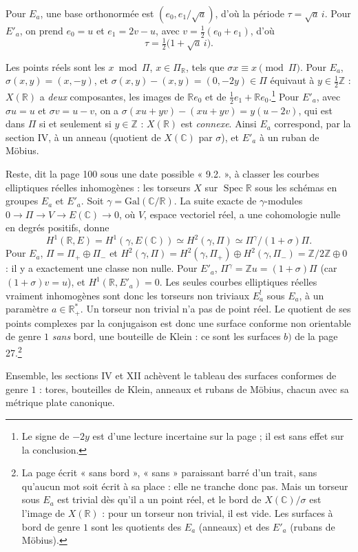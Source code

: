\documentclass[11pt,a4paper]{article}
\begin{document}
Pour $E_a$, une base orthonormée est $(e_0, e_1/\sqrt a)$, d'où la période
$\tau = \sqrt{a}\, i$. Pour $E'_a$, on prend $e_0 = u$ et $e_1 = 2v - u$, avec
$v = \frac12(e_0 + e_1)$, d'où
\[
\tau = \tfrac12\bigl(1 + \sqrt{a}\, i\bigr).
\]

Les points réels sont les $x \bmod \Pi$, $x \in \Pi_{\mathbb{R}}$, tels que
$\sigma x \equiv x \pmod{\Pi}$. Pour $E_a$, $\sigma(x,y) = (x,-y)$, et
$\sigma(x,y) - (x,y) = (0, -2y) \in \Pi$ équivaut à $y \in
\frac12\mathbb{Z}$ : $X(\mathbb{R})$ a \emph{deux} composantes, les images de
$\mathbb{R}e_0$ et de $\frac12 e_1 + \mathbb{R}e_0$.\footnote{Le signe de
$-2y$ est d'une lecture incertaine sur la page ; il est sans effet sur la
conclusion.} Pour $E'_a$, avec $\sigma u = u$ et $\sigma v = u - v$, on a
$\sigma(xu + yv) - (xu + yv) = y(u - 2v)$, qui est dans $\Pi$ si et seulement
si $y \in \mathbb{Z}$ : $X(\mathbb{R})$ est \emph{connexe}. Ainsi $E_a$
correspond, par la section IV, à un anneau (quotient de $X(\mathbb{C})$ par
$\sigma$), et $E'_a$ à un ruban de Möbius.

Reste, dit la page 100 sous une date possible « 9.2. », à classer les
courbes elliptiques réelles inhomogènes : les torseurs $X$ sur
$\operatorname{Spec}\mathbb{R}$ sous les schémas en groupes $E_a$ et $E'_a$.
Soit $\gamma = \mathrm{Gal}(\mathbb{C}/\mathbb{R})$. La suite exacte de
$\gamma$-modules $0 \to \Pi \to V \to E(\mathbb{C}) \to 0$, où $V$, espace
vectoriel réel, a une cohomologie nulle en degrés positifs, donne
\[
H^{1}(\mathbb{R}, E) = H^{1}(\gamma, E(\mathbb{C})) \simeq H^{2}(\gamma,
\Pi) \simeq \Pi^{\gamma}/(1 + \sigma)\Pi .
\]
Pour $E_a$, $\Pi = \Pi_{+} \oplus \Pi_{-}$ et
$H^{2}(\gamma, \Pi) = H^{2}(\gamma, \Pi_{+}) \oplus H^{2}(\gamma, \Pi_{-})
= \mathbb{Z}/2\mathbb{Z} \oplus 0$ : il y a exactement une classe non nulle.
Pour $E'_a$, $\Pi^{\gamma} = \mathbb{Z}u = (1 + \sigma)\Pi$ (car $(1 +
\sigma)v = u$), et $H^{1}(\mathbb{R}, E'_a) = 0$. Les seules courbes
elliptiques réelles vraiment inhomogènes sont donc les torseurs non triviaux
$E_a^{!}$ sous $E_a$, à un paramètre $a \in \mathbb{R}^{*}_{+}$. Un torseur
non trivial n'a pas de point réel. Le quotient de ses points complexes par la
conjugaison est donc une surface conforme non orientable de genre $1$
\emph{sans} bord, une bouteille de Klein : ce sont les surfaces $b)$ de la
page 27.\footnote{La page écrit « sans bord », « sans » paraissant barré
d'un trait, sans qu'aucun mot soit écrit à sa place : elle ne tranche donc
pas. Mais un torseur sous $E_a$ est trivial dès qu'il a un
point réel, et le bord de $X(\mathbb{C})/\sigma$ est l'image de
$X(\mathbb{R})$ : pour un torseur non trivial, il est vide. Les surfaces à
bord de genre $1$ sont les quotients des $E_a$ (anneaux) et des $E'_a$
(rubans de Möbius).}

Ensemble, les sections IV et XII achèvent le tableau des surfaces conformes
de genre $1$ : tores, bouteilles de Klein, anneaux et rubans de Möbius,
chacun avec sa métrique plate canonique.
\end{document}
